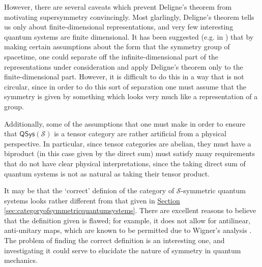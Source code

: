 \documentclass[a4paper,10pt]{scrreprt}
\theoremstyle{definition}
\theoremstyle{plain}
\theoremstyle{remark}
\begin{document}
However, there are several caveats which prevent Deligne's theorem from motivating supersymmetry convincingly. Most glarlingly, Deligne's theorem tells us only about finite-dimensional representations, and very few interesting quantum systems are finite dimensional. It has been suggested (e.g. in \cite{nlab-deligne-theorem}) that by making certain assumptions about the form that the symmetry group of spacetime, one could separate off the infinite-dimensional part of the representations under consideration and apply Deligne's theorem only to the finite-dimensional part. However, it is difficult to do this in a way that is not circular, since in order to do this sort of separation one must assume that the symmetry is given by something which looks very much like a representation of a group.

Additionally, some of the assumptions that one must make in order to ensure that $\mathsf{QSys}(\mathcal{S})$ is a tensor category are rather artificial from a physical perspective. In particular, since tensor categories are abelian, they must have a biproduct (in this case given by the direct sum) must satisfy many requirements that do not have clear physical interpretations, since the taking direct sum of quantum systems is not as natural as taking their tensor product.

It may be that the `correct' definion of the category of $\mathcal{S}$-symmetric quantum systems looks rather different from that given in \hyperref[sec:categoryofsymmetricquantumsystems]{Section \ref*{sec:categoryofsymmetricquantumsystems}}. There are excellent reasons to believe that the definition given is flawed; for example, it does not allow for antilinear, anti-unitary maps, which are known to be permitted due to Wigner's analysis \cite{wigner-little-group}. The problem of finding the correct definition is an interesting one, and investigating it could serve to elucidate the nature of symmetry in quantum mechanics.
\end{document}
